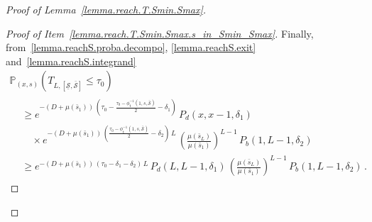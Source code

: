 \documentclass[AHL,Unicode,longabstracts,published]{cedram}
\newcommand{\PP}{\mathbb{P}}
\newcommand{\Smin}{\underline{\mathcal{S}}}
\newcommand{\Smax}{\bar{\mathcal{S}}}
\newcommand{\barmu}{\mu(\bar s_1)}
\newcommand{\phit}{\phi_\textsf{t}^{-1}}
\newcommand{\1}{\mathbf{1}}
\begin{document}
\begin{proof}[Proof of Lemma~\ref{lemma.reach.T.Smin.Smax}]
\begin{proof}[{Proof of Item~\eqref{lemma.reach.T.Smin.Smax.s_in_Smin_Smax}}]
Finally, from~\eqref{lemma.reachS.proba.decompo}, \eqref{lemma.reachS.exit} and~\eqref{lemma.reachS.integrand}
\begin{multline*}
\PP_{(x,s)}\left(T_{L,[\Smin,\Smax]}\leq \tau_0\right)\\
\begin{aligned}
 & \geq e^{-(D+\barmu)\,\left(\tau_0-\frac{\tau_0-\phit\left(1, s,\Smax\right)}{2}-\delta_1\right)}\, P_d(x,x-1, \delta_1)
\\
& \quad \times e^{-(D+\barmu)\,\left(\frac{\tau_0-\phit\left(1, s,\Smax\right)}{2}-\delta_2\right)\,L}\,
\left(\frac{\mu(\bar s_L)}{\barmu}\right)^{L-1}\,P_b(1,L-1, \delta_2)
\\
& \geq e^{-(D+\barmu)\,\left(\tau_0-\delta_1-\delta_2\right)\,L}\, P_d(L,L-1, \delta_1)\,
\left(\frac{\mu(\bar s_L)}{\barmu}\right)^{L-1}\,P_b(1,L-1, \delta_2)\,.
\end{aligned}
\end{multline*}




\end{proof}
\end{proof}
\end{document}
